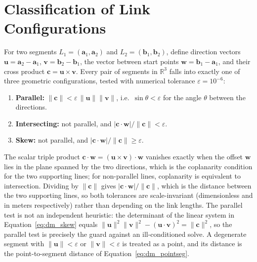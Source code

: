 \section{Classification of Link Configurations}\label{sec:dm_classification}

For two segments $L_1 = (\mathbf{a}_1, \mathbf{a}_2)$ and $L_2 = (\mathbf{b}_1, \mathbf{b}_2)$, define
direction vectors $\mathbf{u} = \mathbf{a}_2 - \mathbf{a}_1$, $\mathbf{v} = \mathbf{b}_2 - \mathbf{b}_1$,
the vector between start points $\mathbf{w} = \mathbf{b}_1 - \mathbf{a}_1$, and their cross product
$\mathbf{c} = \mathbf{u} \times \mathbf{v}$. Every pair of segments in $\mathbb{R}^3$ falls into
exactly one of three geometric configurations, tested with numerical tolerance
$\varepsilon = 10^{-6}$:
\begin{enumerate}
    \item \textbf{Parallel:} $\lVert \mathbf{c} \rVert < \varepsilon\,\lVert \mathbf{u} \rVert \lVert \mathbf{v} \rVert$,
    i.e.\ $\sin\theta < \varepsilon$ for the angle $\theta$ between the directions.
    \item \textbf{Intersecting:} not parallel, and $\lvert \mathbf{c} \cdot \mathbf{w} \rvert / \lVert \mathbf{c} \rVert < \varepsilon$.
    \item \textbf{Skew:} not parallel, and $\lvert \mathbf{c} \cdot \mathbf{w} \rvert / \lVert \mathbf{c} \rVert \geq \varepsilon$.
\end{enumerate}
The scalar triple product $\mathbf{c} \cdot \mathbf{w} = (\mathbf{u} \times \mathbf{v}) \cdot \mathbf{w}$
vanishes exactly when the offset $\mathbf{w}$ lies in the plane spanned by the two directions, which is
the coplanarity condition for the two supporting lines; for non-parallel lines, coplanarity is
equivalent to intersection. Dividing by $\lVert \mathbf{c} \rVert$ gives
$\lvert \mathbf{c} \cdot \mathbf{w} \rvert / \lVert \mathbf{c} \rVert$, which is the distance between the two
supporting lines, so both tolerances are scale-invariant (dimensionless and in meters respectively)
rather than depending on the link lengths. The parallel test is not an independent heuristic: the
determinant of the linear system in Equation~\eqref{eq:dm_skew} equals
$\lVert \mathbf{u} \rVert^2 \lVert \mathbf{v} \rVert^2 - (\mathbf{u} \cdot \mathbf{v})^2 = \lVert \mathbf{c} \rVert^2$,
so the parallel test is precisely the guard against an ill-conditioned solve. A degenerate segment
with $\lVert \mathbf{u} \rVert < \varepsilon$ or $\lVert \mathbf{v} \rVert < \varepsilon$ is treated as a point, and its
distance is the point-to-segment distance of Equation~\eqref{eq:dm_pointseg}.

